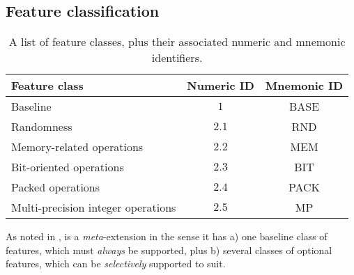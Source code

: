 
\subsection{Feature classification}
\label{sec:bg:feature}

\begin{table}[t]
\begin{center}
\begin{tabular}{|l|cc|}
\hline
Feature class                      & Numeric ID & Mnemonic ID \\
\hline
Baseline                           & $1$        & BASE        \\
Randomness                         & $2.1$      & RND         \\
Memory-related          operations & $2.2$      & MEM         \\
Bit-oriented            operations & $2.3$      & BIT         \\
Packed                  operations & $2.4$      & PACK        \\
Multi-precision integer operations & $2.5$      & MP          \\
\hline
\end{tabular}
\end{center}
\caption{A list of feature classes, plus their associated numeric and mnemonic identifiers.}
\label{tab:feature}
\end{table}

As noted in , \XCID is a {\em meta}-extension in the
sense it has 
a) one baseline class of features,
   which must {\em always} be supported,
   plus
b) several classes of optional               features,
   which can be {\em selectively} supported to suit.



